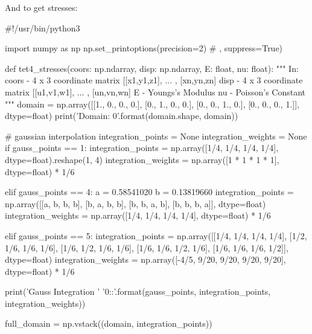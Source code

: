 And to get stresses:
\begin{python}
#!/usr/bin/python3

import numpy as np
np.set_printoptions(precision=2) # , suppress=True)

def tet4_stresses(coors: np.ndarray,
                  disp: np.ndarray,
                  E: float,
                  nu: float):
    """
    In:
        coors - 4 x 3 coordinate matrix
                [[x1,y1,z1], ... , [xn,yn,zn]
        disp  - 4 x 3 coordinate matrix
                [[u1,v1,w1], ... , [un,vn,wn]
        E     - Youngs's Modulus
        nu    - Poisson's Constant
    """
    domain = np.array([[1., 0., 0., 0.],
                       [0., 1., 0., 0.],
                       [0., 0., 1., 0.],
                       [0., 0., 0., 1.]], dtype=float)
    print('Domain: {0}'.format(domain.shape, domain))

    # gaussian interpolation
    integration_points = None
    integration_weights = None
    if gauss_points == 1:
        integration_points = np.array([1/4, 1/4, 1/4, 1/4],
                                      dtype=float).reshape(1, 4)
        integration_weights = np.array([1 * 1 * 1 * 1],
                                       dtype=float) * 1/6

    elif gauss_points == 4:
        a = 0.58541020
        b = 0.13819660
        integration_points = np.array([[a, b, b, b],
                                       [b, a, b, b],
                                       [b, b, a, b],
                                       [b, b, b, a]], dtype=float)
        integration_weights = np.array([1/4, 1/4, 1/4, 1/4],
                                       dtype=float) * 1/6

    elif gauss_points == 5:
        integration_points = np.array([[1/4, 1/4, 1/4, 1/4],
                                       [1/2, 1/6, 1/6, 1/6],
                                       [1/6, 1/2, 1/6, 1/6],
                                       [1/6, 1/6, 1/2, 1/6],
                                       [1/6, 1/6, 1/6, 1/2]], dtype=float)
        integration_weights = np.array([-4/5, 9/20, 9/20, 9/20, 9/20],
                                       dtype=float) * 1/6

    print('Gauss Integration '
          '{0}:\nWeights:'.format(gauss_points,
                                            integration_points,
                                            integration_weights))

    full_domain = np.vstack((domain, integration_points))


\end{python}
